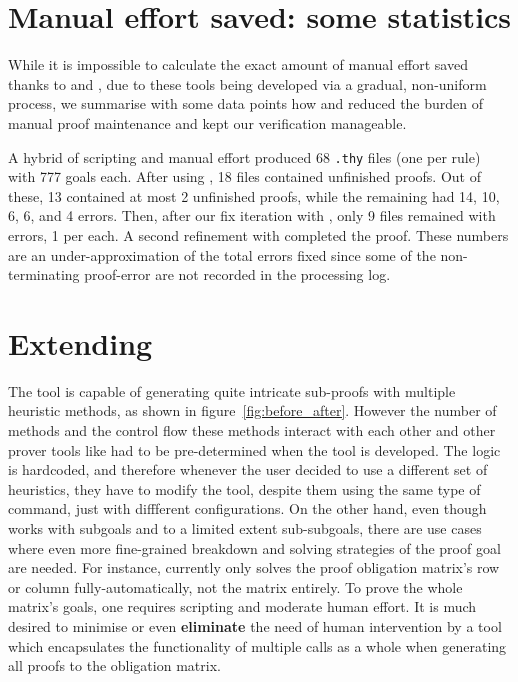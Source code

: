 \documentclass[10pt,conference]{IEEEtran}
\begin{document}
\section{Manual effort saved: some statistics}


While it is impossible to calculate the exact amount of manual effort saved thanks to \supersketch{} and \superfix{},
due to these tools being developed via a gradual, non-uniform process, we summarise with some data points how \supersketch{} and \superfix{} reduced the burden of manual proof maintenance and kept our verification manageable.

A hybrid of scripting and manual effort produced 68 \texttt{.thy} files (one per rule) with 777 goals each. After using \supersketch{}, 18 files contained unfinished proofs. Out of these, 13 contained at most 2 unfinished proofs, while the remaining had 14, 10, 6, 6, and 4 errors.
Then, after our fix iteration with \superfix{}, only 9
files remained with errors, 1 per each. A second refinement
with \superfix{} completed the proof. These \superfix{} numbers are an under-approximation of the total errors fixed since some of the non-terminating proof-error are not recorded in the processing log.

\section{Extending \supersketch{}}\label{sec:doublesketch}
The \supersketch{} tool is capable of generating quite intricate sub-proofs with multiple heuristic methods, as shown in figure~\ref{fig:before_after}. However the number of methods and the control flow these methods interact with each other and other prover tools like \sledgehammer{} had to be pre-determined when the tool is developed. The logic is hardcoded, and therefore whenever the user decided to use a different set of heuristics, they have to modify the tool, despite them using the same type of command, just with diffferent configurations.
On the other hand, even though \supersketch{} works with subgoals and to a limited extent sub-subgoals, there are use cases where even more fine-grained breakdown and solving strategies of the proof goal are needed. For instance, \supersketch{} currently only solves the proof obligation matrix's row or column fully-automatically, not the matrix entirely. To prove the whole matrix's goals, one requires scripting and moderate human effort. It is much desired to minimise or even \textbf{eliminate} the need of human intervention by a tool which encapsulates the functionality of multiple \supersketch{} calls as a whole when generating all proofs to the obligation matrix.
\end{document}
